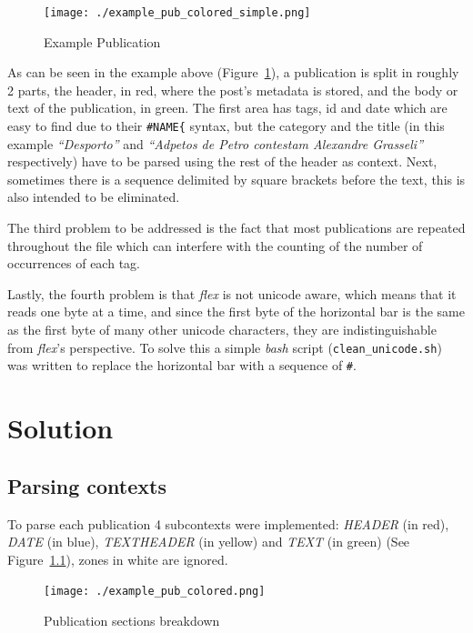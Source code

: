 \documentclass[a4paper]{report}
\begin{document}
\begin{figure}[H]
    \texttt{[image: ./example\_pub\_colored\_simple.png]}
    \caption{Example Publication}\label{fig:example_pub_simple}
\end{figure}

As can be seen in the example above (Figure~\ref{fig:example_pub_simple}), a
publication is split in roughly 2 parts, the header, in red, where the post's
metadata is stored, and the body or text of the publication, in green. The first
area has tags, id and date which are easy to find due to their
\verb!#NAME{! syntax, but the category and the title (in this example
\textit{``Desporto''} and \textit{``Adpetos de Petro contestam Alexandre
Grasseli''} respectively) have to be parsed using the rest of the header as
context. Next, sometimes there is a sequence delimited by square brackets before
the text, this is also intended to be eliminated.

The third problem to be addressed is the fact that most publications
are repeated throughout the file which can interfere with the counting of the
number of occurrences of each tag.

Lastly, the fourth problem is that \textit{flex} is not unicode aware,
which means that it reads one byte at a time, and since the first byte of the
horizontal bar is the same as the first byte of many other unicode characters,
they are indistinguishable from \textit{flex}'s perspective. To solve this a
simple \textit{bash} script (\texttt{clean\_unicode.sh}) was written to replace
the horizontal bar with a sequence of \verb!#!.

\chapter{Solution}

\section{Parsing contexts}

To parse each publication 4 subcontexts were implemented: \textit{HEADER} (in
red), \textit{DATE} (in blue), \textit{TEXTHEADER} (in yellow) and
\textit{TEXT} (in green) (See Figure~\ref{fig:example_pub_colored}), zones in
white are ignored.

\begin{figure}[h]
    \texttt{[image: ./example\_pub\_colored.png]}
    \caption{Publication sections breakdown}\label{fig:example_pub_colored}
\end{figure}
\end{document}
